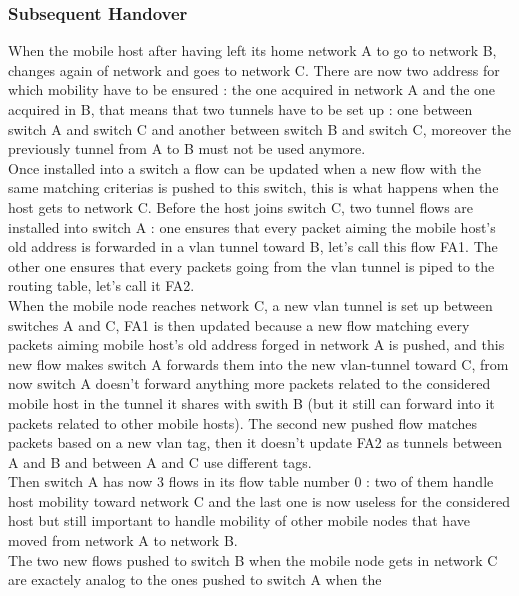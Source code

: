 \documentclass{article}
\begin{document}
\subsubsection{Subsequent Handover}

When the mobile host after having left its home network A to go to
network B, changes again of network and goes to network C. There are
now two address for which mobility have to be ensured : the one
acquired in network A and the one acquired in B, that means that two
tunnels have to be set up : one between switch A and switch C and
another between switch B and switch C, moreover the previously tunnel
from A to B must not be used anymore.\\
\newline
 Once installed into a switch a flow can be updated when a new flow
with the same matching criterias is pushed to this switch, this is
what happens when the host gets to network C. Before the host joins
switch C, two tunnel flows are installed into switch A : one ensures
that every packet aiming the mobile host's old address is forwarded in
a vlan tunnel toward B, let's call this flow FA1. The other one
ensures that every packets going from the vlan tunnel is piped to the
routing table, let's call it FA2.\\
\newline
When the mobile node reaches network C, a new vlan tunnel is set up
between switches A and C, FA1 is then updated because a new flow
matching every packets aiming mobile host's old address forged in
network A is pushed, and this new flow makes switch A forwards them
into the new vlan-tunnel toward C, from now switch A doesn't forward
anything more packets related to the considered mobile host in the tunnel
it shares with swith B (but it still can forward into it packets
related to other mobile hosts). The second new pushed flow matches
packets based on a new vlan tag, then it doesn't update FA2 as tunnels
between A and B and between A and C use different tags. \\
\newline
Then switch A has now 3 flows in its flow table number 0 : two of them
handle host mobility toward network C and the last one is now useless
for the considered host but still important to handle mobility of
other mobile nodes that have moved from network A to network B.\\
\newline
The two new flows pushed to switch B when the mobile node gets in
network C are exactely analog to the ones pushed to switch A when the
\end{document}
